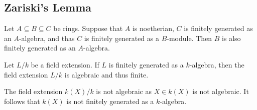 \subsection{Zariski’s Lemma}
\label{subsection: Zariskis lemma}


\begin{lemma}
  Let $A \subseteq B \subseteq C$ be rings.
  Suppose that $A$ is noetherian, $C$ is finitely generated as an $A$-algebra, and thas $C$ is finitely generated as a $B$-module.
  Then $B$ is also finitely generated as an $A$-algebra.
\end{lemma}




\begin{lemma}
  \label{lemma: finitely generated field extensions are algebraic}
  Let $L/k$ be a field extension.
  If $L$ is finitely generated as a $k$-algebra, then the field extension $L/k$ is algebraic and thus finite.
\end{lemma}




\begin{example}
  The field extension $k(X)/k$ is not algebraic as $X \in k(X)$ is not algebraic.
  It follows that $k(X)$ is not finitely generated as a $k$-algebra.
\end{example}


